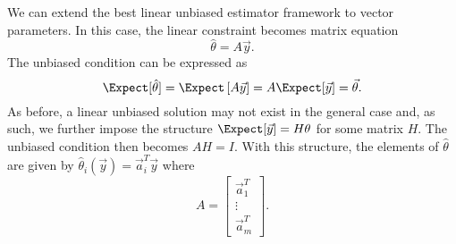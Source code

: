 We can extend the best linear unbiased estimator framework to vector parameters.
In this case, the linear constraint becomes matrix equation
\begin{equation*}
\hat{\theta} = A \vec{y} .
\end{equation*}
The unbiased condition can be expressed as
\begin{equation*}
\Expect [ \hat{\theta} ]
= \Expect \left[ A \vec{y} \right]
= A \Expect [ \vec{y} ] = \vec{\theta} .
\end{equation*}
As before, a linear unbiased solution may not exist in the general case and, as such, we further impose the structure $\Expect [ \vec{y} ] = H \theta$ for some matrix $H$.
The unbiased condition then becomes $A H = I$.
With this structure, the elements of $\hat{\theta}$ are given by $\hat{\theta}_i (\vec{y}) = \vec{a}_i^T \vec{y}$ where
\begin{equation*}
A = \begin{bmatrix} \vec{a}_1^T \\ 
\vdots \\ \vec{a}_m^T \end{bmatrix} .
\end{equation*}
